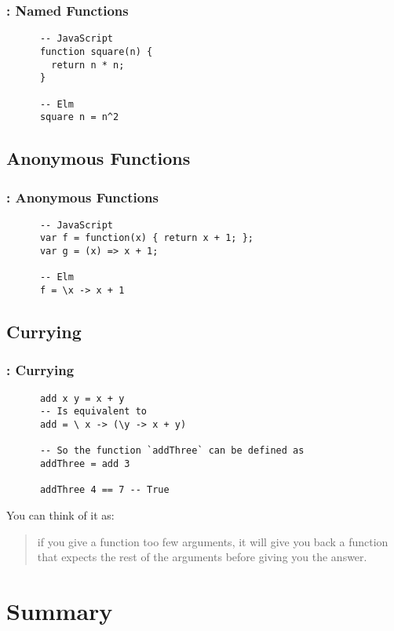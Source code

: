 \documentclass{beamer}
\begin{document}
\frame %

\begin{frame}[fragile]
  \frametitle{\insertsection: Named Functions}
    \begin{lstlisting}
      -- JavaScript
      function square(n) {
        return n * n;
      }

      -- Elm
      square n = n^2
    \end{lstlisting}
\end{frame}

\subsection{Anonymous Functions}

\begin{frame}[fragile]
  \frametitle{\insertsection: Anonymous Functions}
    \begin{lstlisting}
      -- JavaScript
      var f = function(x) { return x + 1; };
      var g = (x) => x + 1;

      -- Elm
      f = \x -> x + 1
    \end{lstlisting}
\end{frame}

\subsection{Currying}

\begin{frame}[fragile]
  \frametitle{\insertsection: Currying}

    \begin{lstlisting}
      add x y = x + y
      -- Is equivalent to
      add = \ x -> (\y -> x + y)

      -- So the function `addThree` can be defined as
      addThree = add 3

      addThree 4 == 7 -- True
    \end{lstlisting}


    \pause

    You can think of it as:

    \begin{quote}
      if you give a function too few arguments, it will give you back a function
      that expects the rest of the arguments before giving you the answer.
    \end{quote}
\end{frame}

\section*{Summary}
\end{document}
